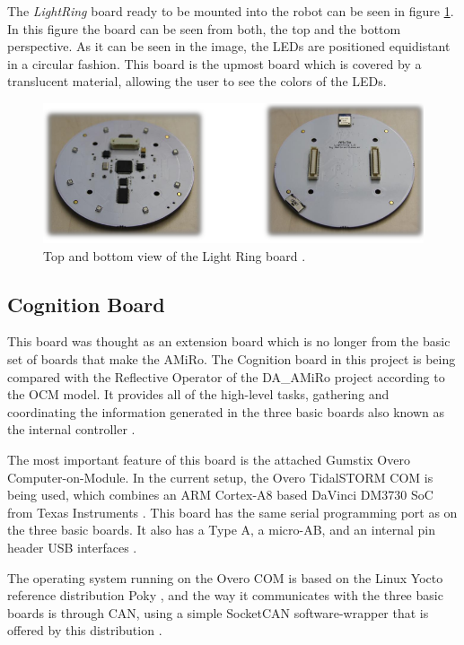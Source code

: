 \documentclass[12pt]{report}%
\begin{document}
The \textit{LightRing} board ready to be mounted into the robot can be seen in figure \ref{fig:lightr}. In this figure the board can be seen from both, the top and the bottom perspective. As it can be seen in the image, the LEDs are positioned equidistant in a circular fashion. This board is the upmost board which is covered by a translucent material, allowing the user to see the colors of the LEDs.

\begin{figure}[ht]
	\centering
	\includegraphics[width=\textwidth]{light_real}
    \caption{Top and bottom view of the Light Ring board \cite{AMiRo_ppt_v1}.}
    \label{fig:lightr}
\end{figure}
\clearpage

\subsection{Cognition Board}
\label{sub:cogn}
This board was thought as an extension board which is no longer from the basic set of boards that make the AMiRo. The Cognition board in this project is being compared with the Reflective Operator of the DA\_AMiRo project according to the OCM model. It provides all of the high-level tasks, gathering and coordinating the information generated in the three basic boards also known as the internal controller \cite{AMiRo_paper_modular}.

The most important feature of this board is the attached Gumstix Overo Computer-on-Module. In the current setup, the Overo TidalSTORM COM is being used, which combines an ARM Cortex-A8 based DaVinci DM3730 SoC from Texas Instruments \cite{AMiRo_paper_modular}. This board has the same serial programming port as on the three basic boards. It also has a Type A, a micro-AB, and an internal pin header USB interfaces \cite{AMiRo_paper_modular}.

The operating system running on the Overo COM is based on the Linux Yocto reference distribution Poky \cite{poky}, and the way it communicates with the three basic boards is through CAN, using a simple SocketCAN software-wrapper that is offered by this distribution \cite{AMiRo_paper_modular}.
\end{document}
